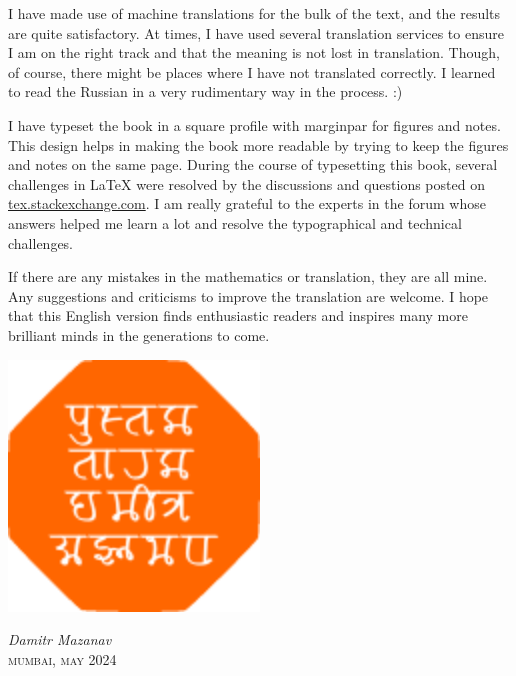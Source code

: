I have made use of machine translations for the bulk of the text, and the results are quite satisfactory. At times, I have used several translation services to ensure I am on the right track and that the meaning is not lost in translation. Though, of course, there might be places where I have not translated correctly. I learned to read the Russian in a very rudimentary way in the process. :)

I have typeset the book in a square profile with marginpar for figures and notes. This design helps in making the book more readable by trying to keep the figures and notes on the same page. During the course of typesetting this book, several challenges in \LaTeX{} were resolved by the discussions and questions posted on \url{tex.stackexchange.com}. I am really grateful to the experts in the forum whose answers helped me learn a lot and resolve the typographical and technical challenges.

If there are any mistakes in the mathematics or translation, they are all mine. Any suggestions and criticisms to improve the translation are welcome. I hope that this English version finds enthusiastic readers and inspires many more brilliant minds in the generations to come.

\begin{marginfigure}
\includegraphics[width=0.5\textwidth]{figures/pustaktarak.pdf}
\end{marginfigure}
\begin{flushright}
\emph{Damitr Mazanav}\\
\textsc{mumbai, may 2024}
\end{flushright}

\clearpage